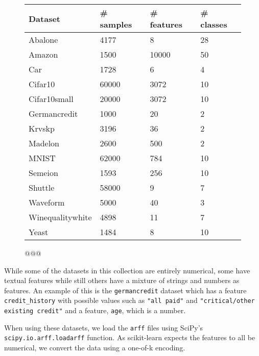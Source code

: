 \documentclass[a4paper,12pt,twoside,openright]{report}
\begin{document}
\begin{figure}
\centering

\begin{tabular}{|l|l|l|l|}
\hline
Dataset          & \# samples & \# features & \# classes \\ \hline\hline
Abalone          & 4177       & 8           & 28         \\ \hline
Amazon           & 1500       & 10000       & 50         \\ \hline
Car              & 1728       & 6           & 4          \\ \hline
Cifar10          & 60000      & 3072        & 10         \\ \hline
Cifar10small     & 20000      & 3072        & 10         \\ \hline
Germancredit     & 1000       & 20          & 2          \\ \hline
Krvskp           & 3196       & 36          & 2          \\ \hline
Madelon          & 2600       & 500         & 2          \\ \hline
MNIST            & 62000      & 784         & 10         \\ \hline
Semeion          & 1593       & 256         & 10         \\ \hline
Shuttle          & 58000      & 9           & 7          \\ \hline
Waveform         & 5000       & 40          & 3          \\ \hline
Winequalitywhite & 4898       & 11          & 7          \\ \hline
Yeast            & 1484       & 8           & 10         \\ \hline
\end{tabular}

\caption{@@@}
\label{datasets_info}

\end{figure}


While some of the datasets in this collection are entirely numerical, some have textual features while still others have a mixture of strings and numbers as features. An example of this is the \texttt{germancredit} dataset which has a feature \texttt{credit\_history} with possible values such as \texttt{"all paid"} and \texttt{"critical/other existing credit"} and a feature,  \texttt{age}, which is a number.

When using these datasets, we load the \texttt{arff} files using SciPy's \texttt{scipy.io.arff.loadarff} function. As scikit-learn expects the features to all be numerical, we convert the data using a one-of-k encoding.
\end{document}
